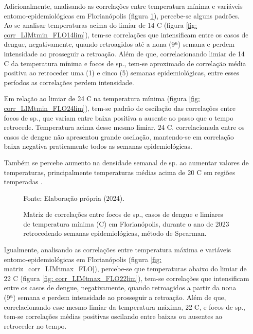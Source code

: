 \indent Adicionalmente, analisando as correlações entre temperatura mínima e variáveis entomo-epidemiológicas em Florianópolis (figura \ref{fig: matriz_corr_LIMtmin_FLO}), percebe-se alguns padrões. Ao se analisar temperaturas acima do limiar de 14 C (figura \ref{fig: corr_LIMtmin_FLO14lim}), tem-se correlações que intensificam entre os casos de dengue, negativamente, quando retroagidos até a nona (9ª) semana e perdem intensidade ao prosseguir a retroação. Além de que, correlacionando limiar de 14 C da temperatura mínima e focos de  sp., tem-se aproximado de correlação média positiva ao retroceder uma (1) e cinco (5) semanas epidemiológicas, entre esses períodos as correlações perdem intensidade.

\indent Em relação ao limiar de 24 C na temperatura mínima (figura \ref{fig: corr_LIMtmin_FLO24lim}), tem-se padrão de oscilação das correlações entre focos de  sp., que variam entre baixa positiva a ausente ao passo que o tempo retrocede. Temperatura acima desse mesmo limiar, 24 C, correlacionada entre os casos de dengue não apresentou grande oscilação, mantendo-se em correlação baixa negativa praticamente todos as semanas epidemiológicas. 

\indent Também se percebe aumento na densidade semanal de  sp. ao aumentar valores de temperaturas, principalmente temperaturas médias acima de 20 C em regiões temperadas \cite{Valle2015Dengue}.

\begin{figure}[htbp]
    \begin{center}
    \caption{Matriz de correlações entre focos de  sp., casos de dengue e limiares de temperatura mínima (C) em Florianópolis, durante o ano de 2023 retrocedendo semanas epidemiológicas, método de Spearman.}
    \label{fig: matriz_corr_LIMtmin_FLO}
        \hfill
    \end{center}
    \small{Fonte: Elaboração própria (2024).}
\end{figure}

\indent Igualmente, analisando as correlações entre temperatura máxima e variáveis entomo-epidemiológicas em Florianópolis (figura \ref{fig: matriz_corr_LIMtmax_FLO}), percebe-se que temperaturas abaixo do limiar de 22 C (figura \ref{fig: corr_LIMtmax_FLO22lim}), tem-se correlações que intensificam entre os casos de dengue, negativamente, quando retroagidos a partir da nona (9ª) semana e perdem intensidade ao prosseguir a retroação. Além de que, correlacionando esse mesmo limiar da temperatura máxima, 22 C, e focos de  sp., tem-se correlações médias positivas oscilando entre baixas ou ausentes ao retroceder no tempo.

